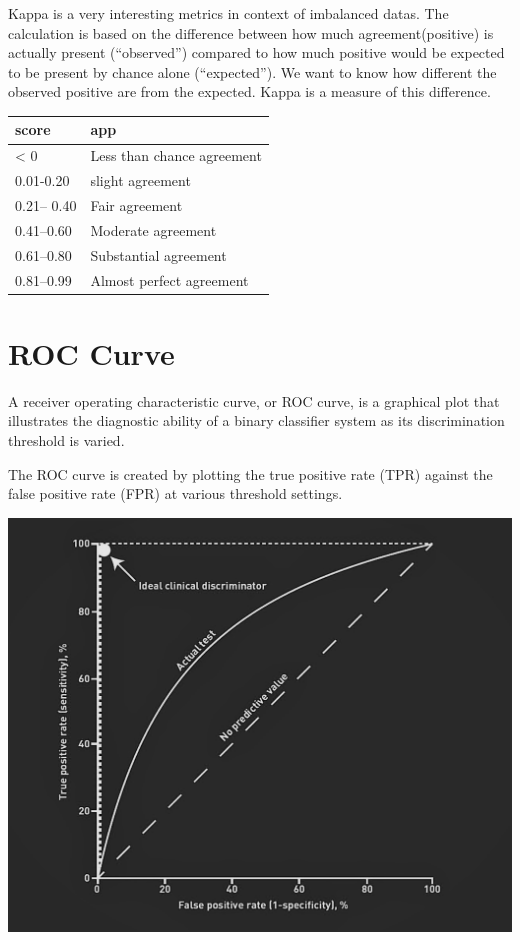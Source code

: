 \documentclass[
]{report}
\begin{document}
Kappa is a very interesting metrics in context of imbalanced datas.
The calculation is based on the difference between how much agreement(positive) is actually present (``observed'') compared to how much positive would be expected to be present by chance alone (``expected''). We want to know how different the observed positive are from the expected. Kappa is a measure of this difference\citep{kappa}.

\begin{table}
\centering
\begin{tabular}{l|l}
\hline
score & app\\
\hline
< 0 & Less than chance agreement\\
\hline
0.01-0.20 & slight agreement\\
\hline
0.21– 0.40 & Fair agreement\\
\hline
0.41–0.60 & Moderate agreement\\
\hline
0.61–0.80 & Substantial agreement\\
\hline
0.81–0.99 & Almost perfect agreement\\
\hline
\end{tabular}
\end{table}

\hypertarget{roc-curve}{%
\section{ROC Curve}\label{roc-curve}}

A receiver operating characteristic curve, or ROC curve, is a graphical plot that illustrates the diagnostic ability of a binary classifier system as its discrimination threshold is varied.

The ROC curve is created by plotting the true positive rate (TPR) against the false positive rate (FPR) at various threshold settings.

\begin{center}\includegraphics{Roc} \end{center}
\end{document}
